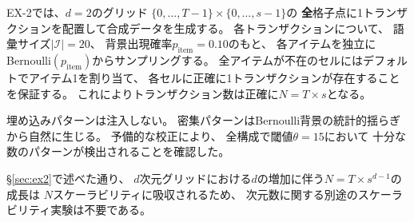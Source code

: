 EX-2では、$d = 2$のグリッド
$\{0,\ldots,T{-}1\} \times \{0,\ldots,s{-}1\}$の
\textbf{全}格子点に1トランザクションを配置して合成データを生成する。
各トランザクションについて、
語彙サイズ$|\mathcal{I}| = 20$、
背景出現確率$p_{\mathrm{item}} = 0.10$のもと、
各アイテムを独立にBernoulli$(p_{\mathrm{item}})$からサンプリングする。
全アイテムが不在のセルにはデフォルトでアイテム1を割り当て、
各セルに正確に1トランザクションが存在することを保証する。
これによりトランザクション数は正確に$N = T \times s$となる。

埋め込みパターンは注入しない。
密集パターンはBernoulli背景の統計的揺らぎから自然に生じる。
予備的な校正により、
全構成で閾値$\theta = 15$において
十分な数のパターンが検出されることを確認した。

\S\ref{sec:ex2}で述べた通り、
$d$次元グリッドにおける$d$の増加に伴う$N = T \times s^{d-1}$の成長は
$N$スケーラビリティに吸収されるため、
次元数に関する別途のスケーラビリティ実験は不要である。

